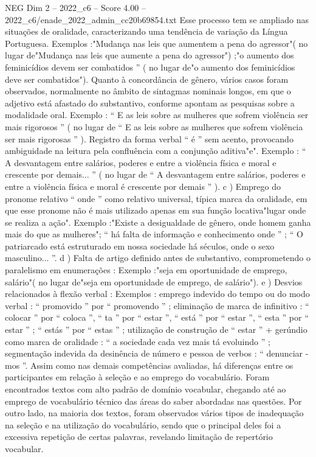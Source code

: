 \begin{textsample}{NEG Dim 2 – 2022\_c6 – Score 4.00 – 2022\_c6/enade\_2022\_admin\_cc20b69854.txt}
Esse processo tem se ampliado nas situações de oralidade, caracterizando uma tendência de variação da Língua Portuguesa.
Exemplos :"Mudança nas leis que aumentem a pena do agressor"( no lugar de"Mudança nas leis que aumente a pena do agressor") ;"o aumento dos feminicídios devem ser combatidos ” ( no lugar de"o aumento dos feminicídios deve ser combatidos").
Quanto à concordância de gênero, vários casos foram observados, normalmente no âmbito de sintagmas nominais longos, em que o adjetivo está afastado do substantivo, conforme apontam as pesquisas sobre a modalidade oral.
Exemplo : “ E as leis sobre as mulheres que sofrem violência ser mais rigorosos ” ( no lugar de “ E as leis sobre as mulheres que sofrem violência ser mais rigorosas ” ).
Registro da forma verbal “ é ” sem acento, provocando ambiguidade na leitura pela confluência com a conjunção aditiva"e".
Exemplo : “ A desvantagem entre salários, poderes e entre a violência física e moral e crescente por demais... ” ( no lugar de “ A desvantagem entre salários, poderes e entre a violência física e moral é crescente por demais ” ). c ) Emprego do pronome relativo “ onde ” como relativo universal, típica marca da oralidade, em que esse pronome não é mais utilizado apenas em sua função locativa"lugar onde se realiza a ação".
Exemplo :"Existe a desigualdade de gênero, onde homem ganha mais do que as mulheres"; “ há falta de informação e conhecimento onde ” ; “ O patriarcado está estruturado em nossa sociedade há séculos, onde o sexo masculino... ”. d ) Falta de artigo definido antes de substantivo, comprometendo o paralelismo em enumerações : Exemplo :"seja em oportunidade de emprego, salário"( no lugar de"seja em oportunidade de emprego, de salário"). e ) Desvios relacionados à flexão verbal : Exemplos : emprego indevido do tempo ou do modo verbal : “ promovido ” por “ promovendo ” ; eliminação de marca de infinitivo : “ colocar ” por “ coloca ”, “ ta ” por “ estar ”, “ está ” por “ estar ”, “ esta ” por “ estar ” ; “ estás ” por “ estas ” ; utilização de construção de “ estar ” + gerúndio como marca de oralidade : “ a sociedade cada vez mais tá evoluindo ” ; segmentação indevida da desinência de número e pessoa de verbos : “ denunciar -mos ”.
Assim como nas demais competências avaliadas, há diferenças entre os participantes em relação à seleção e ao emprego do vocabulário.
Foram encontrados textos com alto padrão de domínio vocabular, chegando até ao emprego de vocabulário técnico das áreas do saber abordadas nas questões.
Por outro lado, na maioria dos textos, foram observados vários tipos de inadequação na seleção e na utilização do vocabulário, sendo que o principal deles foi a excessiva repetição de certas palavras, revelando limitação de repertório vocabular.

\end{textsample}
